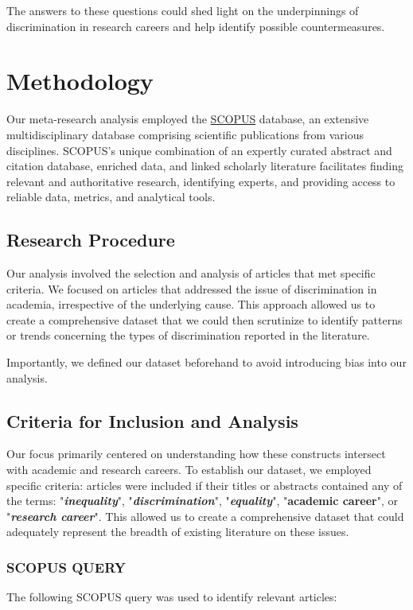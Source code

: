 \documentclass[runningheads]{llncs}
\begin{document}
The answers to these questions could shed light on the underpinnings of discrimination in research careers and help identify possible countermeasures.


\section{Methodology}
Our meta-research analysis employed the \href{https://www.scopus.com/}{SCOPUS} database, an extensive multidisciplinary database comprising scientific publications from various disciplines. SCOPUS's unique combination of an expertly curated abstract and citation database, enriched data, and linked scholarly literature facilitates finding relevant and authoritative research, identifying experts, and providing access to reliable data, metrics, and analytical tools.

\subsection{Research Procedure}
Our analysis involved the selection and analysis of articles that met specific criteria. We focused on articles that addressed the issue of discrimination in academia, irrespective of the underlying cause. This approach allowed us to create a comprehensive dataset that we could then scrutinize to identify patterns or trends concerning the types of discrimination reported in the literature. 

Importantly, we defined our dataset beforehand to avoid introducing bias into our analysis.

\subsection{Criteria for Inclusion and Analysis}
Our focus primarily centered on understanding how these constructs intersect with academic and research careers. To establish our dataset, we employed specific criteria: articles were included if their titles or abstracts contained any of the terms: "\textbf{\textit{inequality}}", "\textbf{\textit{discrimination}}", "\textbf{\textit{equality}}", "\textbf{academic career}", or "\textbf{\textit{research career}}". This allowed us to create a comprehensive dataset that could adequately represent the breadth of existing literature on these issues.

\subsubsection{SCOPUS QUERY}
The following SCOPUS query was used to identify relevant articles:
\end{document}
